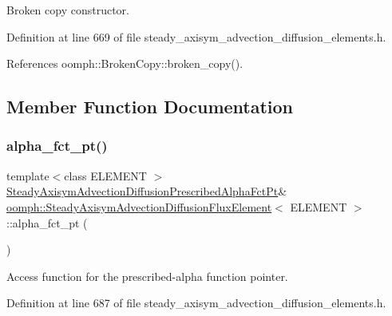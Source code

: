 Broken copy constructor. 



Definition at line 669 of file steady\+\_\+axisym\+\_\+advection\+\_\+diffusion\+\_\+elements.\+h.



References oomph\+::\+Broken\+Copy\+::broken\+\_\+copy().



\subsection{Member Function Documentation}
\mbox{\label{classoomph_1_1SteadyAxisymAdvectionDiffusionFluxElement_a00b6f2f505ed91d63435537d1ca8b8f0}} 
\subsubsection{\texorpdfstring{alpha\+\_\+fct\+\_\+pt()}{alpha\_fct\_pt()}}
{\footnotesize\ttfamily template$<$class E\+L\+E\+M\+E\+NT $>$ \\
\hyperlink{classoomph_1_1SteadyAxisymAdvectionDiffusionFluxElement_a28cea997740e6174b3e3583d704229ce}{Steady\+Axisym\+Advection\+Diffusion\+Prescribed\+Alpha\+Fct\+Pt}\& \hyperlink{classoomph_1_1SteadyAxisymAdvectionDiffusionFluxElement}{oomph\+::\+Steady\+Axisym\+Advection\+Diffusion\+Flux\+Element}$<$ E\+L\+E\+M\+E\+NT $>$\+::alpha\+\_\+fct\+\_\+pt (\begin{DoxyParamCaption}{ }\end{DoxyParamCaption})\hspace{0.3cm}{\ttfamily [inline]}}



Access function for the prescribed-\/alpha function pointer. 



Definition at line 687 of file steady\+\_\+axisym\+\_\+advection\+\_\+diffusion\+\_\+elements.\+h.

\mbox{\label{classoomph_1_1SteadyAxisymAdvectionDiffusionFluxElement_a6e6c927f4aa0f0f3bf07c5b0474254f2}} 
